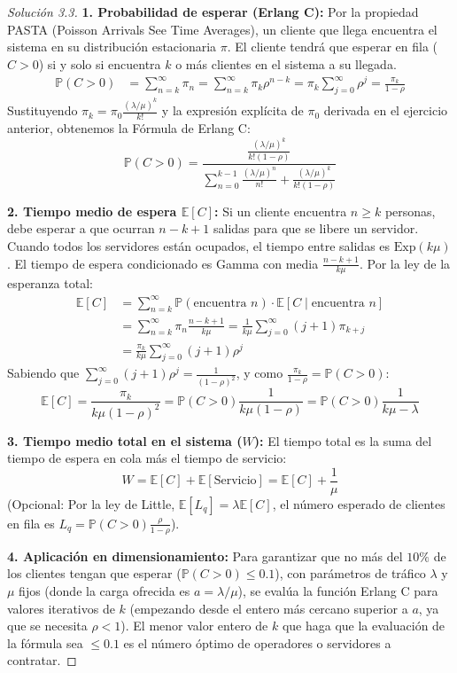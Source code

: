 \documentclass[10pt,a4paper]{article}
\begin{document}
\begin{proof}[Solución 3.3]
    \textbf{1. Probabilidad de esperar (Erlang C):}
    Por la propiedad PASTA (Poisson Arrivals See Time Averages), un cliente que llega encuentra el sistema en su distribución estacionaria $\pi$. El cliente tendrá que esperar en fila ($C > 0$) si y solo si encuentra $k$ o más clientes en el sistema a su llegada.
    \begin{align*}
        \mathbb{P}(C > 0) &= \sum_{n=k}^\infty \pi_n = \sum_{n=k}^\infty \pi_k \rho^{n-k} = \pi_k \sum_{j=0}^\infty \rho^j = \frac{\pi_k}{1-\rho}
    \end{align*}
    Sustituyendo $\pi_k = \pi_0 \frac{(\lambda/\mu)^k}{k!}$ y la expresión explícita de $\pi_0$ derivada en el ejercicio anterior, obtenemos la Fórmula de Erlang C:
    \[ \mathbb{P}(C > 0) = \frac{\frac{(\lambda/\mu)^k}{k!(1-\rho)}}{\sum_{n=0}^{k-1} \frac{(\lambda/\mu)^n}{n!} + \frac{(\lambda/\mu)^k}{k!(1-\rho)}} \]

    \textbf{2. Tiempo medio de espera $\mathbb{E}[C]$:}
    Si un cliente encuentra $n \ge k$ personas, debe esperar a que ocurran $n - k + 1$ salidas para que se libere un servidor. Cuando todos los servidores están ocupados, el tiempo entre salidas es $\text{Exp}(k\mu)$.
    El tiempo de espera condicionado es Gamma con media $\frac{n - k + 1}{k\mu}$.
    Por la ley de la esperanza total:
    \begin{align*}
        \mathbb{E}[C] &= \sum_{n=k}^\infty \mathbb{P}(\text{encuentra } n) \cdot \mathbb{E}[C \mid \text{encuentra } n] \\
        &= \sum_{n=k}^\infty \pi_n \frac{n - k + 1}{k\mu} = \frac{1}{k\mu} \sum_{j=0}^\infty (j+1) \pi_{k+j} \\
        &= \frac{\pi_k}{k\mu} \sum_{j=0}^\infty (j+1)\rho^j
    \end{align*}
    Sabiendo que $\sum_{j=0}^\infty (j+1)\rho^j = \frac{1}{(1-\rho)^2}$, y como $\frac{\pi_k}{1-\rho} = \mathbb{P}(C>0)$:
    \[ \mathbb{E}[C] = \frac{\pi_k}{k\mu (1-\rho)^2} = \mathbb{P}(C>0) \frac{1}{k\mu (1-\rho)} = \mathbb{P}(C>0) \frac{1}{k\mu - \lambda} \]

    \textbf{3. Tiempo medio total en el sistema ($W$):}
    El tiempo total es la suma del tiempo de espera en cola más el tiempo de servicio:
    \[ W = \mathbb{E}[C] + \mathbb{E}[\text{Servicio}] = \mathbb{E}[C] + \frac{1}{\mu} \]
    (Opcional: Por la ley de Little, $\mathbb{E}[L_q] = \lambda \mathbb{E}[C]$, el número esperado de clientes en fila es $L_q = \mathbb{P}(C>0) \frac{\rho}{1-\rho}$).

    \textbf{4. Aplicación en dimensionamiento:}
    Para garantizar que no más del $10\%$ de los clientes tengan que esperar ($\mathbb{P}(C>0) \le 0.1$), con parámetros de tráfico $\lambda$ y $\mu$ fijos (donde la carga ofrecida es $a = \lambda/\mu$), se evalúa la función Erlang C para valores iterativos de $k$ (empezando desde el entero más cercano superior a $a$, ya que se necesita $\rho < 1$). El menor valor entero de $k$ que haga que la evaluación de la fórmula sea $\le 0.1$ es el número óptimo de operadores o servidores a contratar.
\end{proof}
\end{document}
